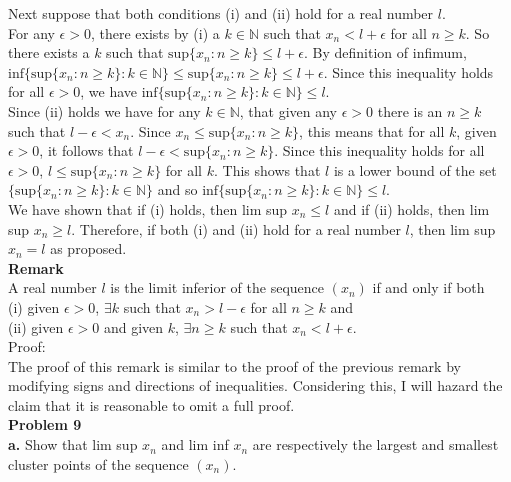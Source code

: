 \documentclass[a4paper]{article}
\begin{document}
Next suppose that both conditions (i) and (ii) hold for a real number $l$.\\

For any $\epsilon > 0$, there exists by (i) a $k \in \mathbb{N}$ such that $x_n < l+\epsilon$ for all $n\geq k$. So there exists a $k$ such that $\text{sup} \{x_n : n \geq k\} \leq l+\epsilon$. By definition of infimum, $\text{inf}\{\text{sup} \{x_n : n \geq k\} : k \in \mathbb{N}\} \leq \text{sup} \{x_n : n \geq k\} \leq l+\epsilon$. Since this inequality holds for all $\epsilon > 0$, we have $\text{inf}\{\text{sup} \{x_n : n \geq k\} : k \in \mathbb{N}\} \leq l$. \\

Since (ii) holds we have for any $k \in \mathbb{N}$, that given any $\epsilon >0$ there is an $n\geq k$ such that $l-\epsilon < x_n$. Since $x_n \leq \text{sup} \{x_n : n \geq k\}$, this means that for all $k$, given $\epsilon>0$, it follows that $l-\epsilon < \text{sup} \{x_n : n \geq k\}$. Since this inequality holds for all $\epsilon >0$, $l \leq \text{sup} \{x_n : n \geq k\}$ for all $k$. This shows that $l$ is a lower bound of the set $\{\text{sup} \{x_n : n \geq k\} : k \in \mathbb{N}\}$ and so $\text{inf}\{\text{sup} \{x_n : n \geq k\} : k \in \mathbb{N}\} \leq l$.\\

We have shown that if (i) holds, then lim sup $x_n \leq l$ and if (ii) holds, then lim sup $x_n \geq l$. Therefore, if both (i) and (ii) hold for a real number $l$, then lim sup $x_n = l$ as proposed. \\

{\bf Remark}\\
A real number $l$ is the limit inferior of the sequence $(x_n)$ if and only if both\\
(i) given $\epsilon >0$, $\exists k$ such that $x_n > l-\epsilon$ for all $n \geq k$ and \\
(ii) given $\epsilon >0$ and given $k$, $\exists n \geq k$ such that $x_n < l + \epsilon$.\\

Proof:\\
The proof of this remark is similar to the proof of the previous remark by modifying signs and directions of inequalities. Considering this, I will hazard the claim that it is reasonable to omit a full proof.\\

{\bf Problem 9}\\
{\bf a.} Show that lim sup $x_n$ and lim inf $x_n$ are respectively the largest and smallest cluster points of the sequence $(x_n)$. \\
\end{document}
